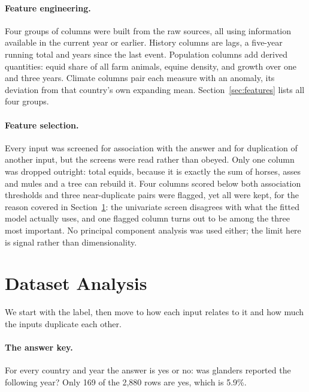 \documentclass[10pt]{article}
\begin{document}
\paragraph{Feature engineering.} Four groups of columns were built from the raw sources,
all using information available in the current year or earlier. History columns are lags, a
five-year running total and years since the last event. Population columns add derived
quantities: equid share of all farm animals, equine density, and growth over one and three
years. Climate columns pair each measure with an anomaly, its deviation from that country's
own expanding mean. Section~\ref{sec:features} lists all four groups.

\paragraph{Feature selection.} Every input was screened for association with the answer and
for duplication of another input, but the screens were read rather than obeyed. Only one column
was dropped outright: total equids, because it is exactly the sum of horses, asses and mules and a
tree can rebuild it. Four columns scored below both association thresholds and three near-duplicate
pairs were flagged, yet all were kept, for the reason covered in Section~\ref{sec:analysis}: the
univariate screen disagrees with what the fitted model actually uses, and one flagged column turns
out to be among the three most important. No principal component analysis was used either; the
limit here is signal rather than dimensionality.

\section{Dataset Analysis}
\label{sec:analysis}

We start with the label, then move to how each input relates to it and how much the inputs
duplicate each other.

\paragraph{The answer key.} For every country and year the answer is yes or no: was
glanders reported the following year? Only 169 of the 2,880 rows are yes, which is 5.9\%.
\end{document}
